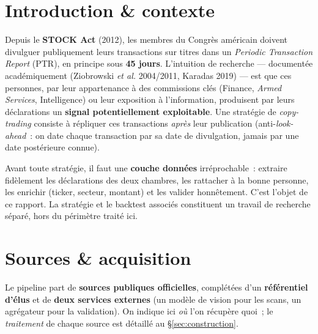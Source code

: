 \documentclass[11pt,a4paper]{article}
\begin{document}
\section{Introduction \& contexte}
Depuis le \textbf{STOCK Act} (2012), les membres du Congrès américain doivent divulguer publiquement
leurs transactions sur titres dans un \emph{Periodic Transaction Report} (PTR), en principe sous
\textbf{45 jours}. L'intuition de recherche — documentée académiquement (Ziobrowski \emph{et al.}
2004/2011, Karadas 2019) — est que ces personnes, par leur appartenance à des commissions clés
(Finance, \emph{Armed Services}, Intelligence) ou leur exposition à l'information, produisent par leurs
déclarations un \textbf{signal potentiellement exploitable}. Une stratégie de \emph{copy-trading}
consiste à répliquer ces transactions \emph{après} leur publication (anti-\emph{look-ahead}~: on date
chaque transaction par sa date de divulgation, jamais par une date postérieure connue).

Avant toute stratégie, il faut une \textbf{couche données} irréprochable~: extraire fidèlement les
déclarations des deux chambres, les rattacher à la bonne personne, les enrichir (ticker, secteur,
montant) et les valider honnêtement. C'est l'objet de ce rapport. La stratégie et le backtest associés
constituent un travail de recherche séparé, hors du périmètre traité ici.

\section{Sources \& acquisition}
\label{sec:sources}

Le pipeline part de \textbf{sources publiques officielles}, complétées d'un \textbf{référentiel d'élus}
et de \textbf{deux services externes} (un modèle de vision pour les scans, un agrégateur pour la
validation). On indique ici \emph{où} l'on récupère quoi~; le \emph{traitement} de chaque source est
détaillé au §\ref{sec:construction}.
\end{document}
